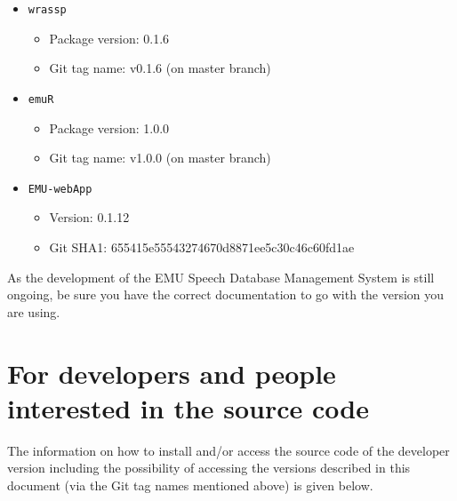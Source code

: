 \documentclass[]{book}
\providecommand{\tightlist}{%
  \setlength{\itemsep}{0pt}\setlength{\parskip}{0pt}}
\theoremstyle{definition}
\theoremstyle{definition}
\theoremstyle{definition}
\theoremstyle{remark}
\begin{document}
\begin{itemize}
\tightlist
\item
  \texttt{wrassp}

  \begin{itemize}
  \tightlist
  \item
    Package version: 0.1.6
  \item
    Git tag name: v0.1.6 (on master branch)
  \end{itemize}
\item
  \texttt{emuR}

  \begin{itemize}
  \tightlist
  \item
    Package version: 1.0.0
  \item
    Git tag name: v1.0.0 (on master branch)
  \end{itemize}
\item
  \texttt{EMU-webApp}

  \begin{itemize}
  \tightlist
  \item
    Version: 0.1.12
  \item
    Git SHA1: 655415e55543274670d8871ee5c30c46c60fd1ae
  \end{itemize}
\end{itemize}

As the development of the EMU Speech Database Management System is still
ongoing, be sure you have the correct documentation to go with the
version you are using.

\hypertarget{for-developers-and-people-interested-in-the-source-code}{%
\section{For developers and people interested in the source
code}\label{for-developers-and-people-interested-in-the-source-code}}

The information on how to install and/or access the source code of the
developer version including the possibility of accessing the versions
described in this document (via the Git tag names mentioned above) is
given below.
\end{document}
